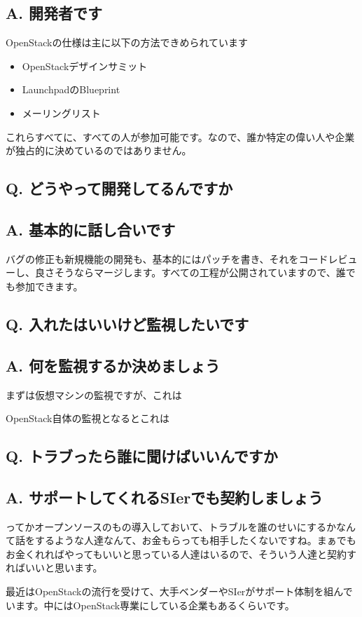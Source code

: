 \documentclass[9pt,b5paper,tombo,openany]{jsbook}
\begin{document}
\subsection*{A. 開発者です}
OpenStackの仕様は主に以下の方法できめられています
\begin{itemize}
	\item OpenStackデザインサミット
	\item LaunchpadのBlueprint
	\item メーリングリスト
\end{itemize}
これらすべてに、すべての人が参加可能です。なので、誰か特定の偉い人や企業が独占的に決めているのではありません。

\subsection*{Q. どうやって開発してるんですか}
\subsection*{A. 基本的に話し合いです}
バグの修正も新規機能の開発も、基本的にはパッチを書き、それをコードレビューし、良さそうならマージします。すべての工程が公開されていますので、誰でも参加できます。

\subsection*{Q. 入れたはいいけど監視したいです}
\subsection*{A. 何を監視するか決めましょう}
まずは仮想マシンの監視ですが、これは

OpenStack自体の監視となるとこれは

\subsection*{Q. トラブったら誰に聞けばいいんですか}
\subsection*{A. サポートしてくれるSIerでも契約しましょう}
ってかオープンソースのもの導入しておいて、トラブルを誰のせいにするかなんて話をするような人達なんて、お金もらっても相手したくないですね。まぁでもお金くれればやってもいいと思っている人達はいるので、そういう人達と契約すればいいと思います。

最近はOpenStackの流行を受けて、大手ベンダーやSIerがサポート体制を組んでいます。中にはOpenStack専業にしている企業もあるくらいです。
\end{document}
